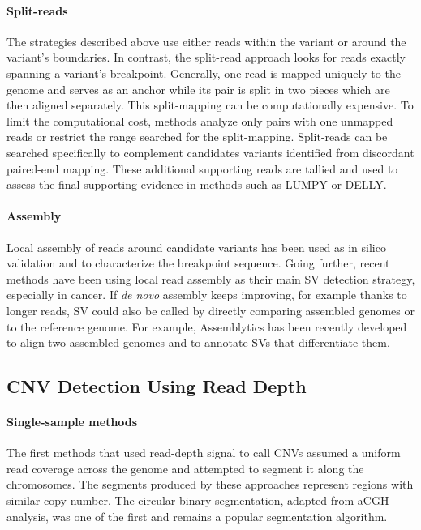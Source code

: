 \paragraph{Split-reads}
The strategies described above use either reads within the variant or around the variant's boundaries.
In contrast, the split-read approach looks for reads exactly spanning a variant's breakpoint.
Generally, one read is mapped uniquely to the genome and serves as an anchor while its pair is split in two pieces which are then aligned separately.
This split-mapping can be computationally expensive.
To limit the computational cost, methods analyze only pairs with one unmapped reads or restrict the range searched for the split-mapping\cite{Ye2009,Faust2012}.
Split-reads can be searched specifically to complement candidates variants identified from discordant paired-end mapping.
These additional supporting reads are tallied and used to assess the final supporting evidence in methods such as \textsf{LUMPY}\cite{Layer2012} or \textsf{DELLY}\cite{Rausch2012}.

\paragraph{Assembly}
Local assembly of reads around candidate variants has been used as in silico validation and to characterize the breakpoint sequence\cite{Wong2010,Chen2014}.
Going further, recent methods have been using local read assembly as their main SV detection strategy, especially in cancer\cite{Zhuang2015,Chong2016}.
If {\it {\it de novo}} assembly keeps improving, for example thanks to longer reads, SV could also be called by directly comparing assembled genomes or to the reference genome.
For example, \textsf{Assemblytics} has been recently developed to align two assembled genomes and to annotate SVs that differentiate them\cite{Nattestad2016}.

\subsection{CNV Detection Using Read Depth}

\paragraph{Single-sample methods}
The first methods that used read-depth signal to call CNVs assumed a uniform read coverage across the genome and attempted to segment it along the chromosomes.
The segments produced by these approaches represent regions with similar copy number.
The circular binary segmentation, adapted from aCGH analysis\cite{cam2008ide}, was one of the first and remains a popular segmentation algorithm.

